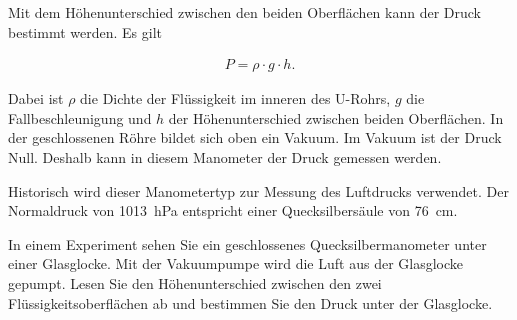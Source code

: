 \begin{minipage}{0.5\textwidth}
\end{minipage}
\begin{minipage}{0.5\textwidth}

	Mit dem Höhenunterschied zwischen den beiden Oberflächen kann der Druck bestimmt werden. Es gilt


\begin{cbox}
	\begin{eqnarray*}
		P= \rho\cdot g\cdot h.
	\end{eqnarray*}
\end{cbox}

Dabei ist $\rho$ die Dichte der Flüssigkeit im inneren des U-Rohrs, $g$ die Fallbeschleunigung und $h$ der Höhenunterschied
zwischen beiden Oberflächen.
In der geschlossenen Röhre bildet sich oben ein Vakuum. Im Vakuum ist der Druck Null. Deshalb kann
in diesem Manometer der Druck gemessen werden.
\end{minipage}
Historisch wird dieser Manometertyp zur Messung des Luftdrucks verwendet.
Der Normaldruck von \SI{1013}{hPa} entspricht einer Quecksilbersäule von \SI{76}{cm}.

\begin{aufgabe}
	In einem Experiment sehen Sie ein geschlossenes Quecksilbermanometer unter einer Glasglocke.
	Mit der Vakuumpumpe wird die Luft aus der Glasglocke gepumpt.
	Lesen Sie den Höhenunterschied zwischen den zwei Flüssigkeitsoberflächen ab und bestimmen Sie den Druck unter der Glasglocke.
\end{aufgabe}
